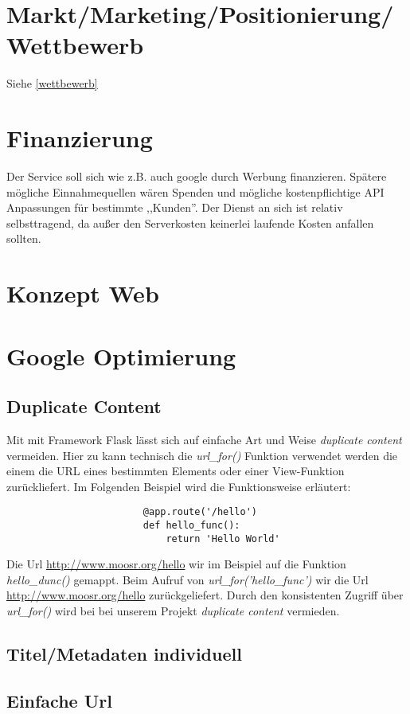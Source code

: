 \documentclass[11pt]{scrreprt}
\begin{document}
\chapter{Markt/Marketing/Positionierung/Wettbewerb}
Siehe \ref{wettbewerb}
\chapter{Finanzierung}
Der Service soll sich wie z.B. auch google durch Werbung finanzieren. Spätere
mögliche Einnahmequellen wären Spenden und mögliche kostenpflichtige API
Anpassungen für bestimmte ,,Kunden''.
Der Dienst an sich ist relativ selbsttragend, da außer den Serverkosten
keinerlei laufende Kosten anfallen sollten.

\chapter{Konzept Web}

\chapter{Google Optimierung}
\section{Duplicate Content}
Mit mit Framework Flask lässt sich auf einfache Art und Weise \emph{duplicate
content} vermeiden. Hier zu kann technisch die \emph{url\_for()} Funktion
verwendet werden die einem die URL eines bestimmten Elements oder einer
View-Funktion zurückliefert. Im Folgenden Beispiel wird die Funktionsweise
erläutert:
\begin{verbatim}
                        @app.route('/hello')
                        def hello_func():
                            return 'Hello World'
\end{verbatim}

Die Url \url{http://www.moosr.org/hello} wir im Beispiel auf die Funktion
\emph{hello\_dunc()} gemappt. Beim Aufruf von \emph{url\_for('hello\_func')} wir
die Url \url{http://www.moosr.org/hello} zurückgeliefert. Durch den konsistenten
Zugriff über \emph{url\_for()} wird bei bei unserem Projekt
\emph{duplicate content} vermieden.


\section{Titel/Metadaten individuell}
\section{Einfache Url}
\end{document}
